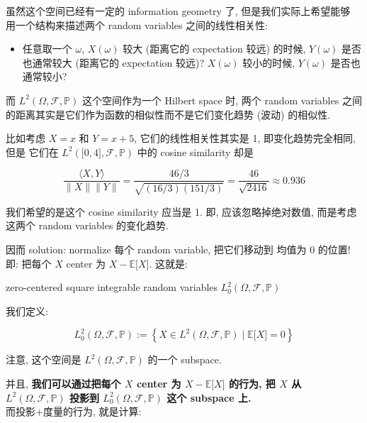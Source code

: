 \documentclass{qlnotes-export}
\begin{document}
虽然这个空间已经有一定的 information geometry 了, 但是我们实际上希望能够 用一个结构来描述两个 random variables 之间的线性相关性:

\begin{itemize}
\tightlist
\item
  任意取一个 \(\omega\), \(X(\omega)\) 较大 (距离它的 expectation 较远) 的时候, \(Y(\omega)\) 是否也通常较大 (距离它的 expectation 较远)? \(X(\omega)\) 较小的时候, \(Y(\omega)\) 是否也通常较小?
\end{itemize}

而 \(L^{2}(\Omega,\mathcal{F},{\mathbb{P}})\) 这个空间作为一个 Hilbert space 时, 两个 random variables 之间的距离其实是它们作为函数的相似性而不是它们变化趋势 (波动) 的相似性.

比如考虑 \(X = x\) 和 \(Y = x + 5\), 它们的线性相关性其实是 1, 即变化趋势完全相同, 但是 它们在 \(L^{2}(\lbrack 0,4\rbrack,\mathcal{F},{\mathbb{P}})\) 中的 cosine similarity 却是

\[\frac{\langle X,Y\rangle}{\parallel X \parallel \parallel Y \parallel} = \frac{46/3}{\sqrt{(16/3)(151/3)}} = \frac{46}{\sqrt{2416}} \approx 0.936\]

我们希望的是这个 cosine similarity 应当是 1. 即, 应该忽略掉绝对数值, 而是考虑这两个 random variables 的变化趋势.

因而 solution: normalize 每个 random variable, 把它们移动到 均值为 0 的位置! 即: 把每个 \(X\) center 为 \(X - {\mathbb{E}}\lbrack X\rbrack\). 这就是:

\begin{definition}{zero-centered square integrable random variables
\(L_{0}^{2}(\Omega,\mathcal{F},{\mathbb{P}})\)}\label{def-02-random-variables-zero-centered-square-integrable-random-variables-l-2-0-omega-mat}

我们定义:

\[L_{0}^{2}(\Omega,\mathcal{F},{\mathbb{P}}) := \left\{ {X \in L^{2}(\Omega,\mathcal{F},{\mathbb{P}}) \mid {\mathbb{E}}\lbrack X\rbrack = 0} \right\}\]

注意, 这个空间是 \(L^{2}(\Omega,\mathcal{F},{\mathbb{P}})\) 的一个 subspace.

\end{definition}

并且, \textbf{我们可以通过把每个 \(X\) center 为 \(X - {\mathbb{E}}\lbrack X\rbrack\) 的行为, 把 \(X\) 从 \(L^{2}(\Omega,\mathcal{F},{\mathbb{P}})\) 投影到 \(L_{0}^{2}(\Omega,\mathcal{F},{\mathbb{P}})\) 这个 subspace 上.}\\
而投影+度量的行为, 就是计算:
\end{document}
